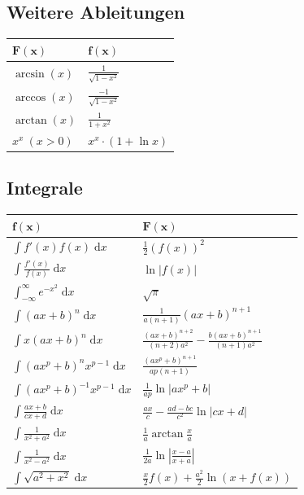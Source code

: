 \documentclass[a4paper,10pt]{article}
\def\dx{\; \mathrm{d}x}
\begin{document}
\subsection{Weitere Ableitungen}
\begin{center}
  \begin{tabularx}{\linewidth}{>{\centering\arraybackslash}X>{\centering\arraybackslash}X}
    \toprule
    $\mathbf{F(x)}$ & $\mathbf{f(x)}$ \\
    \midrule
    $\arcsin(x)$ & $\frac{1}{\sqrt{1 - x^2}}$ \\
    $\arccos(x)$ & $\frac{-1}{\sqrt{1 - x^2}}$ \\
    $\arctan(x)$ & $\frac{1}{1 + x^2}$ \\ 
    $x^x \ (x > 0)$ & $x^x \cdot (1 + \ln x)$ \\
    \bottomrule
  \end{tabularx}
\end{center}
\subsection{Integrale}
\begin{center}
  \begin{tabularx}{\linewidth}{>{\centering\arraybackslash}X>{\centering\arraybackslash}X}
    \toprule
    $\mathbf{f(x)}$ & $\mathbf{F(x)}$ \\
    \midrule
    $\int f'(x) f(x) \dx$ & $\frac{1}{2}(f(x))^2$ \\
    $\int \frac{f'(x)}{f(x)} \dx$ & $\ln|f(x)|$ \\
    $\int_{-\infty}^\infty e^{-x^2} \dx$ & $\sqrt{\pi}$ \\
    $\int (ax+b)^n \dx$ & $\frac{1}{a(n+1)}(ax+b)^{n+1}$ \\
    $\int x(ax+b)^n \dx$ & $\frac{(ax+b)^{n+2}}{(n+2)a^2} - \frac{b(ax+b)^{n+1}}{(n+1)a^2}$ \\
    $\int (ax^p+b)^n x^{p-1} \dx$ & $\frac{(ax^p+b)^{n+1}}{ap(n+1)}$ \\
    $\int (ax^p + b)^{-1} x^{p-1} \dx$ & $\frac{1}{ap} \ln |ax^p + b|$ \\
    $\int \frac{ax+b}{cx+d} \dx$ & $\frac{ax}{c} - \frac{ad-bc}{c^2} \ln |cx +d|$ \\
    $\int \frac{1}{x^2+a^2} \dx$ & $\frac{1}{a} \arctan \frac{x}{a}$ \\
    $\int \frac{1}{x^2 - a^2} \dx$ & $\frac{1}{2a} \ln\left| \frac{x-a}{x+a} \right|$ \\
    $\int \sqrt{a^2+x^2} \dx $ & $\frac{x}{2}f(x) + \frac{a^2}{2}\ln(x+f(x))$ \\
    \bottomrule
  \end{tabularx}
\end{center}
\end{document}
